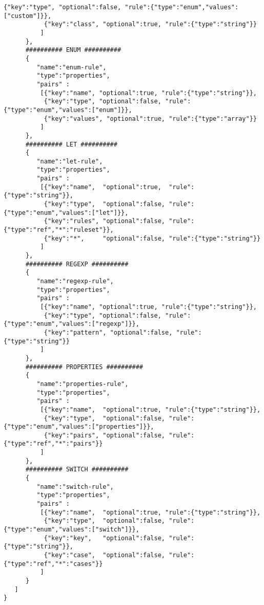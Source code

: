 \documentclass[a4paper]{article}
\begin{document}
\begin{lstlisting}[basicstyle=\ttfamily\scriptsize{}]
           {"key":"type", "optional":false, "rule":{"type":"enum","values":["custom"]}},
           {"key":"class", "optional":true, "rule":{"type":"string"}}
          ]
      },
      ########## ENUM ##########
      {
         "name":"enum-rule",
         "type":"properties",
         "pairs" :
          [{"key":"name", "optional":true, "rule":{"type":"string"}},
           {"key":"type", "optional":false, "rule":{"type":"enum","values":["enum"]}},
           {"key":"values", "optional":true, "rule":{"type":"array"}}
          ]
      },
      ########## LET ##########
      {
         "name":"let-rule",
         "type":"properties",
         "pairs" :
          [{"key":"name",  "optional":true,  "rule":{"type":"string"}},
           {"key":"type",  "optional":false, "rule":{"type":"enum","values":["let"]}},
           {"key":"rules", "optional":false, "rule":{"type":"ref","*":"ruleset"}},
           {"key":"*",     "optional":false, "rule":{"type":"string"}}
          ]
      },
      ########## REGEXP ##########
      {
         "name":"regexp-rule",
         "type":"properties",
         "pairs" :
          [{"key":"name", "optional":true, "rule":{"type":"string"}},
           {"key":"type", "optional":false, "rule":{"type":"enum","values":["regexp"]}},
           {"key":"pattern", "optional":false, "rule":{"type":"string"}}
          ]
      },
      ########## PROPERTIES ##########
      {
         "name":"properties-rule",
         "type":"properties",
         "pairs" :
          [{"key":"name",  "optional":true, "rule":{"type":"string"}},
           {"key":"type",  "optional":false, "rule":{"type":"enum","values":["properties"]}},
           {"key":"pairs", "optional":false, "rule":{"type":"ref","*":"pairs"}}
          ]
      },
      ########## SWITCH ##########
      {
         "name":"switch-rule",
         "type":"properties",
         "pairs" :
          [{"key":"name",  "optional":true, "rule":{"type":"string"}},
           {"key":"type",  "optional":false, "rule":{"type":"enum","values":["switch"]}},
           {"key":"key",   "optional":false, "rule":{"type":"string"}},
           {"key":"case",  "optional":false, "rule":{"type":"ref","*":"cases"}}
          ]
      }
   ]
}
\end{lstlisting}

\newpage
\end{document}
